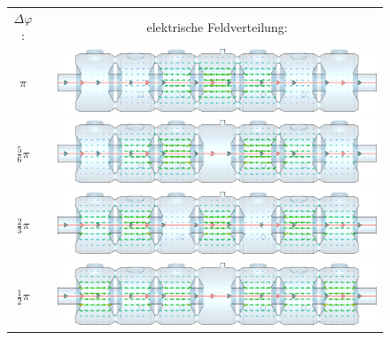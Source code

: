\begin{figure}[p]
	\centering
	\begin{tabular}{ccc}
		$\Delta \varphi$: &\hspace{1cm}& elektrische Feldverteilung:\\[1.5em]
		$\pi$ &&
		\begin{minipage}{0.7\textwidth}
			\vspace{-1mm}
			\includegraphics[width=\textwidth]{./figs/TM010-CST/pi_cut.png}
		\end{minipage} \\[3em]
		$\frac{5}{6}\pi$ &&
		\begin{minipage}{0.7\textwidth}
			\vspace{-1mm}
			\includegraphics[width=\textwidth]{./figs/TM010-CST/5_6_pi_cut.png}
		\end{minipage} \\[3em]
		$\frac{2}{3}\pi$ &&
		\begin{minipage}{0.7\textwidth}
			\vspace{-1mm}
			\includegraphics[width=\textwidth]{./figs/TM010-CST/4_6_pi_cut.png}
		\end{minipage} \\[3em]
		$\frac{1}{2}\pi$ &&
		\begin{minipage}{0.7\textwidth}
			\vspace{-1mm}
			\includegraphics[width=\textwidth]{./figs/TM010-CST/3_6_pi_cut.png}

\end{minipage}
\end{tabular}
\end{figure}
